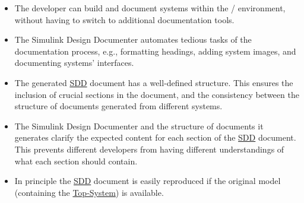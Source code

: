 \documentclass{mcscert}
\newcommand{\sddtool}{Simulink Design Documenter}
\newcommand{\topsystemnolink}{Top-System} %
\newcommand{\topsystem}{\hyperref[def:topsystem]{\topsystemnolink{}}}
\begin{document}
    \begin{itemize}
	  \item The developer can build and document \simulink{} systems within the 
	  \matlab{}/\simulink{} environment, without having to switch to additional 
	  documentation tools.
      \item The \sddtool{} automates tedious tasks of the documentation process,
      e.g., formatting headings, adding system images, and documenting \simulink{}
      systems' interfaces.
      \item The generated \hyperref[acr:sdd]{SDD} document has a well-defined structure. 
      This ensures the inclusion of crucial sections in the document, 
      and the consistency between the structure of documents generated from 
      different \simulink{} systems.
      \item The \sddtool{} and the structure of documents it generates clarify 
      the expected content for each section of the \hyperref[acr:sdd]{SDD} document. 
      This prevents different developers from having different understandings of
      what each section should contain.
      \item In principle the \hyperref[acr:sdd]{SDD} document is easily reproduced if the original \simulink{} 
      model (containing the \topsystem{}) is available.
    \end{itemize}

\end{document}

